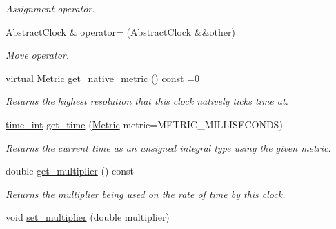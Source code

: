 \begin{DoxyCompactItemize}
\begin{DoxyCompactList}\small\item\em Assignment operator. \end{DoxyCompactList}\item 
\hyperlink{classomi_1_1runtime_1_1_abstract_clock}{Abstract\+Clock} \& \hyperlink{classomi_1_1runtime_1_1_abstract_clock_ae7b8a8d919d194d1fa063cbce5772d1e}{operator=} (\hyperlink{classomi_1_1runtime_1_1_abstract_clock}{Abstract\+Clock} \&\&other)\hypertarget{classomi_1_1runtime_1_1_abstract_clock_ae7b8a8d919d194d1fa063cbce5772d1e}{}\label{classomi_1_1runtime_1_1_abstract_clock_ae7b8a8d919d194d1fa063cbce5772d1e}

\begin{DoxyCompactList}\small\item\em Move operator. \end{DoxyCompactList}\item 
virtual \hyperlink{classomi_1_1runtime_1_1_abstract_clock_a6af6e30a02165469ffcdcbd512d47a1b}{Metric} \hyperlink{classomi_1_1runtime_1_1_abstract_clock_a7889c6c0313723c7546db9b40e7e7fc6}{get\+\_\+native\+\_\+metric} () const =0\hypertarget{classomi_1_1runtime_1_1_abstract_clock_a7889c6c0313723c7546db9b40e7e7fc6}{}\label{classomi_1_1runtime_1_1_abstract_clock_a7889c6c0313723c7546db9b40e7e7fc6}

\begin{DoxyCompactList}\small\item\em Returns the highest resolution that this clock natively ticks time at. \end{DoxyCompactList}\item 
\hyperlink{classomi_1_1runtime_1_1_abstract_clock_af2122541388aea885afc08e8135340f7}{time\+\_\+int} \hyperlink{classomi_1_1runtime_1_1_abstract_clock_ab504674ae140328a3a4dd3a2b02b89c8}{get\+\_\+time} (\hyperlink{classomi_1_1runtime_1_1_abstract_clock_a6af6e30a02165469ffcdcbd512d47a1b}{Metric} metric=M\+E\+T\+R\+I\+C\+\_\+\+M\+I\+L\+L\+I\+S\+E\+C\+O\+N\+DS)\hypertarget{classomi_1_1runtime_1_1_abstract_clock_ab504674ae140328a3a4dd3a2b02b89c8}{}\label{classomi_1_1runtime_1_1_abstract_clock_ab504674ae140328a3a4dd3a2b02b89c8}

\begin{DoxyCompactList}\small\item\em Returns the current time as an unsigned integral type using the given metric. \end{DoxyCompactList}\item 
double \hyperlink{classomi_1_1runtime_1_1_abstract_clock_a2e4f50f159a450e7f57692c9425f6821}{get\+\_\+multiplier} () const 
\begin{DoxyCompactList}\small\item\em Returns the multiplier being used on the rate of time by this clock. \end{DoxyCompactList}\item 
void \hyperlink{classomi_1_1runtime_1_1_abstract_clock_a7d6ea5465b61ada67327f0fbb5fb01d2}{set\+\_\+multiplier} (double multiplier)\hypertarget{classomi_1_1runtime_1_1_abstract_clock_a7d6ea5465b61ada67327f0fbb5fb01d2}{}\label{classomi_1_1runtime_1_1_abstract_clock_a7d6ea5465b61ada67327f0fbb5fb01d2}


\end{DoxyCompactItemize}
